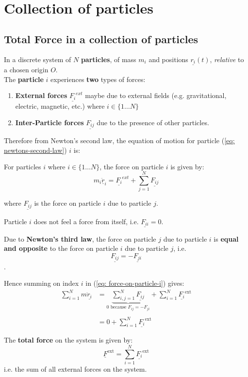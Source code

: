 \section{Collection of particles}
\subsection{Total Force in a collection of particles}
In a discrete system of $N$ {\bf particles}, of mass $m_{i}$ and positions $\underline{r_{i}}(t)$,  {\em relative} to a chosen origin $O$.\\
The {\bf particle} $i$ experiences {\bf two} types of forces:

\begin{enumerate}
	\item {\bf External forces} $\underline{F_{i}}^{ext}$ maybe due to external fields (e.g. gravitational, electric, magnetic, etc.) where $i \in \{1 \ldots N\}$
	\item {\bf Inter-Particle forces} $\underline{F_{ij}}$ due to the presence of other particles.
\end{enumerate}

Therefore from Newton's second law, the equation of motion for particle (\ref{eq: newtons-second-law}) $i$ is:

\begin{definition}
	For particles $i$ where $i \in \{1 \ldots N\}$, the force on particle $i$ is given by:
	\begin{equation}
		\label{eq: force-on-particle-i}
		m_{i} \underline{\ddot{r}}_{i} = \underline{F_{i}}^{ext} + \sum_{j=1}^{N} \underline{F_{ij}}
	\end{equation}

	where $\underline{F_{ij}}$ is the force on particle $i$ due to particle $j$.
\end{definition}

\begin{note}
	Particle $i$ does not feel a force from itself, i.e. $\underline{F_{ii}} = 0$.

\end{note}

Due to {\bf Newton's third law}, the force on particle $j$ due to particle $i$ is {\bf equal and opposite} to the force on particle $i$ due to particle $j$, i.e.
$$\underline{F_{ij}} = - \underline{F_{ji}}$$.

Hence summing on index $i$ in (\ref{eq: force-on-particle-i}) gives:
$$\begin{aligned} \sum\limits_{i=1}^{N} m\underline{\ddot{r}_{i}} & = \underbrace{\sum\limits_{i,j = 1}^{N}\underline{F_{ij}}}_{0 \text{ because } F_{ij} = -F_{ji}} + \sum\limits_{i = 1}^{N}\underline{F_{i}}^{\text{ext}} \\ \\
                                                                & = 0 + \sum\limits_{i=1}^{N}\underline{F_{i}}^{\text{ext}}\end{aligned}$$

\begin{definition}
	The {\bf total force} on the system is given by:
	\begin{equation}
		\label{eq: total-force}
		\underline{F}^{\text{ext}} = \sum_{i=1}^{N} \underline{F_{i}}^{\text{ext}}
	\end{equation}
	i.e. the sum of all external forces on the system.
\end{definition}
